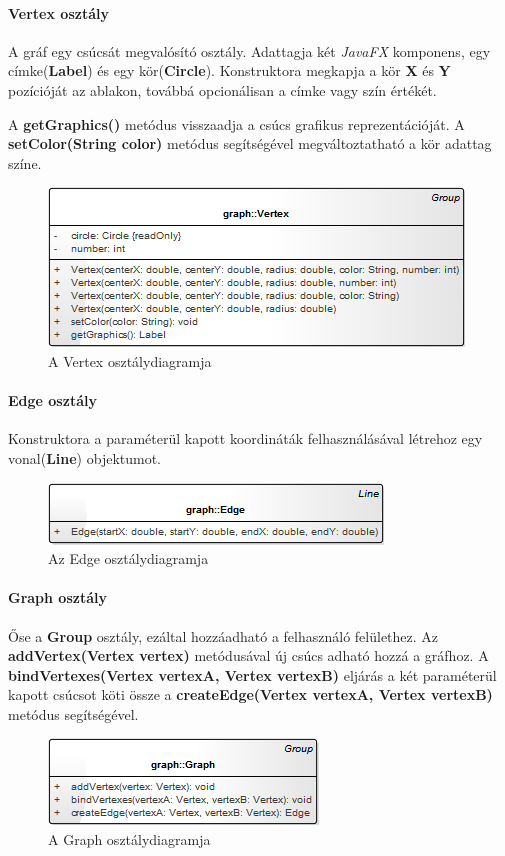 \documentclass{elteikthesis}
\begin{document}
\paragraph{Vertex osztály}
A gráf egy csúcsát megvalósító osztály. Adattagja két \emph{JavaFX} komponens, egy címke(\textbf{Label}) és egy kör(\textbf{Circle}). Konstruktora megkapja a kör \textbf{X} és \textbf{Y} pozícióját az ablakon, továbbá opcionálisan a címke vagy szín értékét.\par
A \textbf{getGraphics()} metódus visszaadja a csúcs grafikus reprezentációját. A \textbf{setColor(String color)} metódus segítségével megváltoztatható a kör adattag színe.
\begin{figure}[H]
	\centering
	\includegraphics{pics/class/Vertex.png}
	\caption{A Vertex osztálydiagramja}
\end{figure}\par
\paragraph{Edge osztály}
Konstruktora a paraméterül kapott koordináták felhasználásával létrehoz egy vonal(\textbf{Line}) objektumot.
\begin{figure}[H]
	\centering
	\includegraphics{pics/class/Edge.png}
	\caption{Az Edge osztálydiagramja}
\end{figure}\par
\paragraph{Graph osztály}
Őse a \textbf{Group} osztály, ezáltal hozzáadható a felhasználó felülethez. Az \textbf{addVertex(Vertex vertex)} metódusával új csúcs adható hozzá a gráfhoz. A \textbf{bindVertexes(Vertex vertexA, Vertex vertexB)} eljárás a két paraméterül kapott csúcsot köti össze a \textbf{createEdge(Vertex vertexA, Vertex vertexB)} metódus segítségével.
\begin{figure}[H]
	\centering
	\includegraphics{pics/class/Graph.png}
	\caption{A Graph osztálydiagramja}
\end{figure}\par
\end{document}
